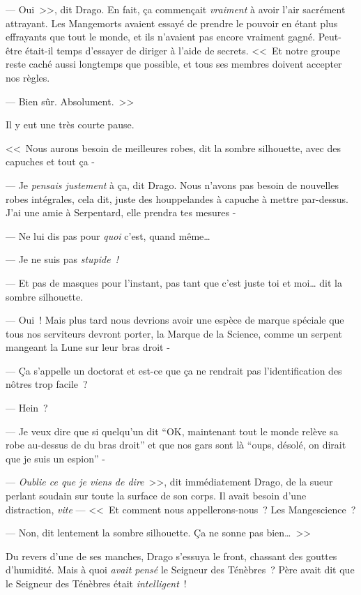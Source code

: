 --- Oui~>>, dit Drago. En fait, ça commençait \emph{vraiment} à avoir l'air sacrément attrayant. Les Mangemorts avaient essayé de prendre le pouvoir en étant plus effrayants que tout le monde, et ils n'avaient pas encore vraiment gagné. Peut-être était-il temps d'essayer de diriger à l'aide de secrets. <<~Et notre groupe reste caché aussi longtemps que possible, et tous ses membres doivent accepter nos règles.

--- Bien sûr. Absolument.~>>

Il y eut une très courte pause.

<<~Nous aurons besoin de meilleures robes, dit la sombre silhouette, avec des capuches et tout ça -

--- Je \emph{pensais justement} à ça, dit Drago. Nous n'avons pas besoin de nouvelles robes intégrales, cela dit, juste des houppelandes à capuche à mettre par-dessus. J'ai une amie à Serpentard, elle prendra tes mesures -

--- Ne lui dis pas pour \emph{quoi} c'est, quand même…

--- Je ne suis pas \emph{stupide~!}

--- Et pas de masques pour l'instant, pas tant que c'est juste toi et moi… dit la sombre silhouette.

--- Oui~! Mais plus tard nous devrions avoir une espèce de marque spéciale que tous nos serviteurs devront porter, la Marque de la Science, comme un serpent mangeant la Lune sur leur bras droit -

--- Ça s'appelle un doctorat et est-ce que ça ne rendrait pas l'identification des nôtres trop facile~?

--- Hein~?

--- Je veux dire que si quelqu'un dit “OK, maintenant tout le monde relève sa robe au-dessus de du bras droit” et que nos gars sont là “oups, désolé, on dirait que je suis un espion” -

--- \emph{Oublie ce que je viens de dire}~>>, dit immédiatement Drago, de la sueur perlant soudain sur toute la surface de son corps. Il avait besoin d'une distraction, \emph{vite} — <<~Et comment nous appellerons-nous~? Les Mangescience~?

--- Non, dit lentement la sombre silhouette. Ça ne sonne pas bien…~>>

Du revers d'une de ses manches, Drago s'essuya le front, chassant des gouttes d'humidité. Mais à quoi \emph{avait pensé} le Seigneur des Ténèbres~? Père avait dit que le Seigneur des Ténèbres était \emph{intelligent}~!

